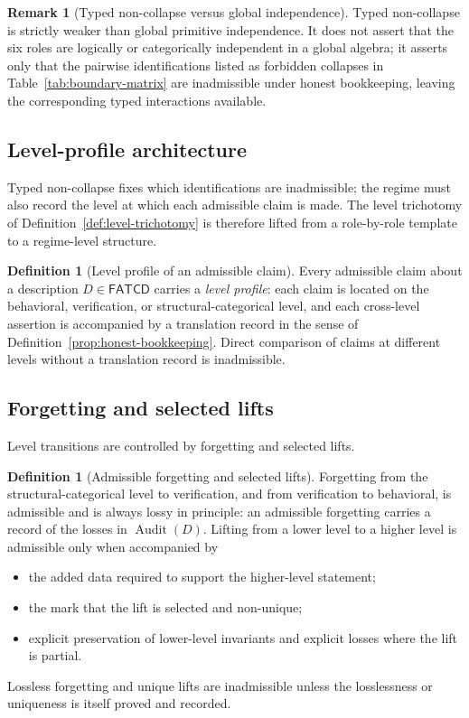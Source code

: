 \documentclass[11pt]{article}
\theoremstyle{definition}
\newtheorem{definition}[theorem]{Definition}
\newtheorem{remark}[theorem]{Remark}
\newcommand{\FATCD}{\ensuremath{\mathsf{FATCD}}}
\newcommand{\Audit}[1]{\ensuremath{\operatorname{Audit}\!\left(#1\right)}}
\begin{document}
\begin{remark}[Typed non-collapse versus global independence]\label{rem:typed-non-collapse-vs-independence}
Typed non-collapse is strictly weaker than global primitive
independence. It does not assert that the six roles are logically or
categorically independent in a global algebra; it asserts only that
the pairwise identifications listed as forbidden collapses in
Table~\ref{tab:boundary-matrix} are inadmissible under honest
bookkeeping, leaving the corresponding typed interactions available.
\end{remark}


\subsection{Level-profile architecture}\label{subsec:level-profile-architecture}

Typed non-collapse fixes which identifications are inadmissible; the
regime must also record the level at which each admissible claim is
made. The level trichotomy of Definition~\ref{def:level-trichotomy}
is therefore lifted from a role-by-role template to a regime-level
structure.

\begin{definition}[Level profile of an admissible claim]\label{prop:level-profile}
Every admissible claim about a description \(D \in \FATCD{}\) carries a
\emph{level profile}: each claim is located on the behavioral,
verification, or structural-categorical level, and each cross-level
assertion is accompanied by a translation record in the sense of
Definition~\ref{prop:honest-bookkeeping}. Direct comparison of claims at
different levels without a translation record is inadmissible.
\end{definition}

\subsection{Forgetting and selected lifts}\label{subsec:forgetting-lifts}

Level transitions are controlled by forgetting and selected lifts.

\begin{definition}[Admissible forgetting and selected lifts]\label{prop:forgetting-lifts}
Forgetting from the structural-categorical level to verification, and
from verification to behavioral, is admissible and is always lossy in
principle: an admissible forgetting carries a record of the losses in
\(\Audit{D}\). Lifting from a lower level to a higher level is
admissible only when accompanied by
\begin{itemize}[topsep=2pt,itemsep=1pt]
  \item the added data required to support the higher-level statement;
  \item the mark that the lift is selected and non-unique;
  \item explicit preservation of lower-level invariants and explicit
    losses where the lift is partial.
\end{itemize}
Lossless forgetting and unique lifts are inadmissible unless the losslessness
or uniqueness is itself proved and recorded.
\end{definition}
\end{document}
